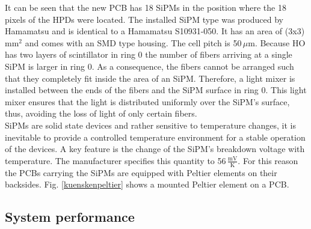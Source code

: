 It can be seen that the new PCB has 18 SiPMs in the position where the 18 pixels of the HPDs were located.
The installed SiPM type was produced by Hamamatsu and is identical to a Hamamatsu S10931-050. It has an area of (3x3)\,mm$^2$ and comes with an SMD type housing. The cell pitch is 50\,$\mu$m.
Because HO has two layers of scintillator in ring 0 the number of fibers arriving at a single SiPM is larger in ring 0. As a consequence, the fibers cannot be arranged such that they completely fit inside the area of an SiPM. Therefore, a light mixer is installed between the ends of the fibers and the SiPM surface in ring 0. This light mixer
ensures that the light is distributed uniformly over the SiPM's surface, thus, avoiding the loss of light of only certain fibers.\\
SiPMs are solid state devices and rather sensitive to temperature changes, it is inevitable to provide a controlled temperature environment for a stable operation of the devices. A key feature is the change of the SiPM's breakdown voltage with temperature. The manufacturer specifies this quantity to 56\,$\frac{\text{mV}}{\text{K}}$. For this reason the PCBs carrying the SiPMs are equipped with Peltier elements on their backsides. Fig. \ref{kuenskenpeltier} shows a mounted Peltier element on a PCB.
\subsection{System performance}
